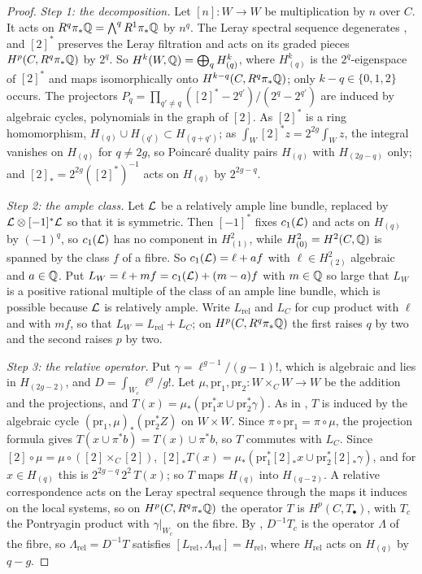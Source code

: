 \begin{proof}
\emph{Step 1: the decomposition.} Let $[n]\colon W\to W$ be multiplication
by $n$ over $C$. It acts on $R^{q}\pi_{*}\mathbb{Q}=\bigwedge^{q}R^{1}\pi_{*}\mathbb{Q}$ by
$n^{q}$. The Leray spectral sequence degenerates \cite[4.1.1(i)]{Del71}, and
$[2]^{*}$ preserves the Leray filtration and acts on its graded pieces
$H^{p}(C,R^{q}\pi_{*}\mathbb{Q})$ by $2^{q}$. So $H^{k}(W,\mathbb{Q})=\bigoplus_{q}
H^{k}_{(q)}$, where $H^{k}_{(q)}$ is the $2^{q}$-eigenspace of $[2]^{*}$ and
maps isomorphically onto $H^{k-q}(C,R^{q}\pi_{*}\mathbb{Q})$; only $k-q\in\{0,1,2\}$
occurs. The projectors
$P_{q}=\prod_{q'\ne q}([2]^{*}-2^{q'})/(2^{q}-2^{q'})$ are induced by
algebraic cycles, polynomials in the graph of $[2]$. As $[2]^{*}$ is a ring
homomorphism, $H_{(q)}\cup H_{(q')}\subset H_{(q+q')}$; as
$\int_{W}[2]^{*}z=2^{2g}\int_{W}z$, the integral vanishes on $H_{(q)}$ for
$q\ne2g$, so Poincar\'e duality pairs $H_{(q)}$ with $H_{(2g-q)}$ only; and
$[2]_{*}=2^{2g}([2]^{*})^{-1}$ acts on $H_{(q)}$ by $2^{2g-q}$.

\emph{Step 2: the ample class.} Let $\mathcal{L}$ be a relatively ample line bundle,
replaced by $\mathcal{L}\otimes[-1]^{*}\mathcal{L}$ so that it is symmetric. Then $[-1]^{*}$
fixes $c_{1}(\mathcal{L})$ and acts on $H_{(q)}$ by $(-1)^{q}$, so $c_{1}(\mathcal{L})$ has no
component in $H^{2}_{(1)}$, while $H^{2}_{(0)}=H^{2}(C,\mathbb{Q})$ is spanned by the
class $f$ of a fibre. So $c_{1}(\mathcal{L})=\ell+af$ with $\ell\in H^{2}_{(2)}$
algebraic and $a\in\mathbb{Q}$. Put $L_{W}=\ell+mf=c_{1}(\mathcal{L})+(m-a)f$ with
$m\in\mathbb{Q}$ so large that $L_{W}$ is a positive rational multiple of the class
of an ample line bundle, which is possible because $\mathcal{L}$ is relatively ample.
Write $L_{\mathrm{rel}}$ and $L_{C}$ for cup product with $\ell$ and with
$mf$, so that $L_{W}=L_{\mathrm{rel}}+L_{C}$; on
$H^{p}(C,R^{q}\pi_{*}\mathbb{Q})$ the first raises $q$ by two and the second raises
$p$ by two.

\emph{Step 3: the relative operator.} Put $\gamma=\ell^{g-1}/(g-1)!$, which is
algebraic and lies in $H_{(2g-2)}$, and $D=\int_{W_{c}}\ell^{g}/g!$. Let
$\mu,\mathrm{pr}_{1},\mathrm{pr}_{2}\colon W\times_{C}W\to W$ be the addition
and the projections, and $T(x)=\mu_{*}(\mathrm{pr}_{1}^{*}x\cup
\mathrm{pr}_{2}^{*}\gamma)$. As in , $T$ is
induced by the algebraic cycle $(\mathrm{pr}_{1},\mu)_{*}(\mathrm{pr}_{2}^{*}Z)$
on $W\times W$. Since $\pi\circ\mathrm{pr}_{1}=\pi\circ\mu$, the projection
formula gives $T(x\cup\pi^{*}b)=T(x)\cup\pi^{*}b$, so $T$ commutes with
$L_{C}$. Since $[2]\circ\mu=\mu\circ([2]\times_{C}[2])$,
$[2]_{*}T(x)=\mu_{*}(\mathrm{pr}_{1}^{*}[2]_{*}x\cup\mathrm{pr}_{2}^{*}
[2]_{*}\gamma)$, and for $x\in H_{(q)}$ this is
$2^{2g-q}\,2^{2}\,T(x)$; so $T$ maps $H_{(q)}$ into $H_{(q-2)}$. A relative
correspondence acts on the Leray spectral sequence through the maps it
induces on the local systems, so on $H^{p}(C,R^{q}\pi_{*}\mathbb{Q})$ the operator
$T$ is $H^{p}(C,T_{\bullet})$, with $T_{c}$ the Pontryagin product with
$\gamma|_{W_{c}}$ on the fibre. By , $D^{-1}T_{c}$
is the operator $\Lambda$ of the fibre, so $\Lambda_{\mathrm{rel}}=D^{-1}T$
satisfies $[L_{\mathrm{rel}},\Lambda_{\mathrm{rel}}]=H_{\mathrm{rel}}$, where
$H_{\mathrm{rel}}$ acts on $H_{(q)}$ by $q-g$.


\end{proof}
